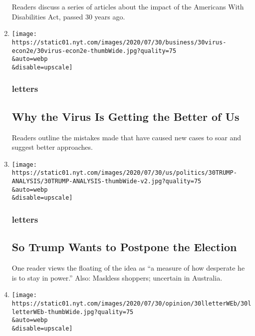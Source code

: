 \begin{enumerate}
  Readers discuss a series of articles about the impact of the Americans
  With Disabilities Act, passed 30 years ago.
\item
  \href{/2020/07/31/opinion/letters/coronavirus-economy.html}{}

  \texttt{[image: https://static01.nyt.com/images/2020/07/30/business/30virus-econ2e/30virus-econ2e-thumbWide.jpg?quality=75\\\&auto=webp\\\&disable=upscale]}

  \hypertarget{letters-5}{%
  \subsubsection{letters}\label{letters-5}}

  \hypertarget{why-the-virus-is-getting-the-better-of-us}{%
  \subsection{Why the Virus Is Getting the Better of
  Us}\label{why-the-virus-is-getting-the-better-of-us}}

  Readers outline the mistakes made that have caused new cases to soar
  and suggest better approaches.
\item
  \href{/2020/07/31/opinion/letters/trump-election.html}{}

  \texttt{[image: https://static01.nyt.com/images/2020/07/30/us/politics/30TRUMP-ANALYSIS/30TRUMP-ANALYSIS-thumbWide-v2.jpg?quality=75\\\&auto=webp\\\&disable=upscale]}

  \hypertarget{letters-6}{%
  \subsubsection{letters}\label{letters-6}}

  \hypertarget{so-trump-wants-to-postpone-the-election}{%
  \subsection{So Trump Wants to Postpone the
  Election}\label{so-trump-wants-to-postpone-the-election}}

  One reader views the floating of the idea as ``a measure of how
  desperate he is to stay in power.'' Also: Maskless shoppers; uncertain
  in Australia.
\item
  \href{/2020/07/30/opinion/letters/john-lewis-civil-rights.html}{}

  \texttt{[image: https://static01.nyt.com/images/2020/07/30/opinion/30lletterWEb/30lletterWEb-thumbWide.jpg?quality=75\\\&auto=webp\\\&disable=upscale]}


\end{enumerate}
